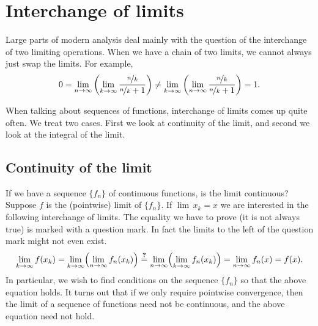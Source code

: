 \documentclass[12pt]{book}
\begin{document}

\sectionnewpage
\section{Interchange of limits}
\label{sec:liminter}


Large parts of modern analysis deal mainly with the question of the
interchange of two limiting operations.
When
we have a chain of two limits, we cannot always just swap the limits.
For example,
\begin{equation*}
0 = 
\lim_{n\to\infty}
\left(
\lim_{k\to\infty}
\frac{\nicefrac{n}{k}}{\nicefrac{n}{k} + 1}
\right)
\not=
\lim_{k\to\infty}
\left(
\lim_{n\to\infty}
\frac{\nicefrac{n}{k}}{\nicefrac{n}{k} + 1}
\right)
= 1 .
\end{equation*}

When talking about sequences of functions, interchange of limits comes up
quite often.
We treat two cases.
First we look at continuity of
the limit, and second we look at the integral of the limit.

\subsection*{Continuity of the limit}

If we have a sequence $\{ f_n \}$ of continuous functions, is the limit continuous?
Suppose $f$ is the (pointwise) limit of $\{ f_n \}$.
If $\lim\, x_k = x$
we are interested in the following
interchange of limits.
The equality we have to prove (it is not always true)
is marked with a question mark.
In fact the limits to the left
of the question mark might not even exist.
\begin{equation*}
\lim_{k \to \infty} 
f(x_k)
=
\lim_{k \to \infty} 
\Bigl(
\lim_{n \to \infty} f_n(x_k)
\Bigr)
\overset{\text{\textbf{?}}}{=}
\lim_{n \to \infty}
\Bigl(
\lim_{k \to \infty} 
f_n(x_k)
\Bigr)
=
\lim_{n \to \infty}
f_n(x)
=
f(x) .
\end{equation*}
In particular, we wish to find conditions on the sequence $\{ f_n \}$
so that the above equation holds.
It turns out that if we only require pointwise convergence, then the limit
of a sequence of functions need not be continuous, and the above equation
need not hold.
\end{document}
